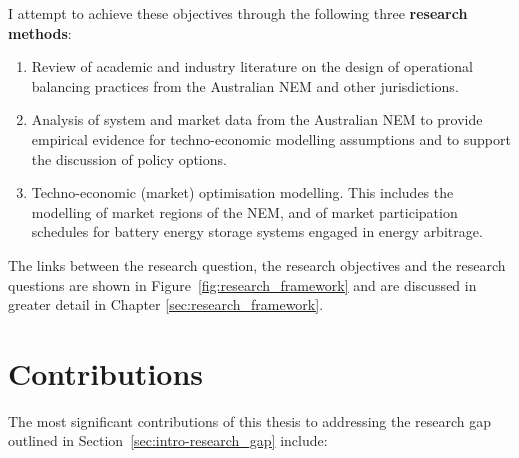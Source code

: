\documentclass[12pt,a4paper,]{report}
\providecommand{\tightlist}{%
  \setlength{\itemsep}{0pt}\setlength{\parskip}{0pt}}
\begin{document}
I attempt to achieve these objectives through the following three
\textbf{research methods}:

\begin{enumerate}
\def\labelenumi{\arabic{enumi}.}
\tightlist
\item
  Review of academic and industry literature on the design of
  operational balancing practices from the Australian NEM and other
  jurisdictions.
\item
  Analysis of system and market data from the Australian NEM to provide
  empirical evidence for techno-economic modelling assumptions and to
  support the discussion of policy options.
\item
  Techno-economic (market) optimisation modelling. This includes the
  modelling of market regions of the NEM, and of market participation
  schedules for battery energy storage systems engaged in energy
  arbitrage.
\end{enumerate}

The links between the research question, the research objectives and the
research questions are shown in Figure~\ref{fig:research_framework} and
are discussed in greater detail in Chapter \ref{sec:research_framework}.

\hypertarget{contributions}{%
\section{Contributions}\label{contributions}}

The most significant contributions of this thesis to addressing the
research gap outlined in Section~\ref{sec:intro-research_gap} include:
\end{document}

